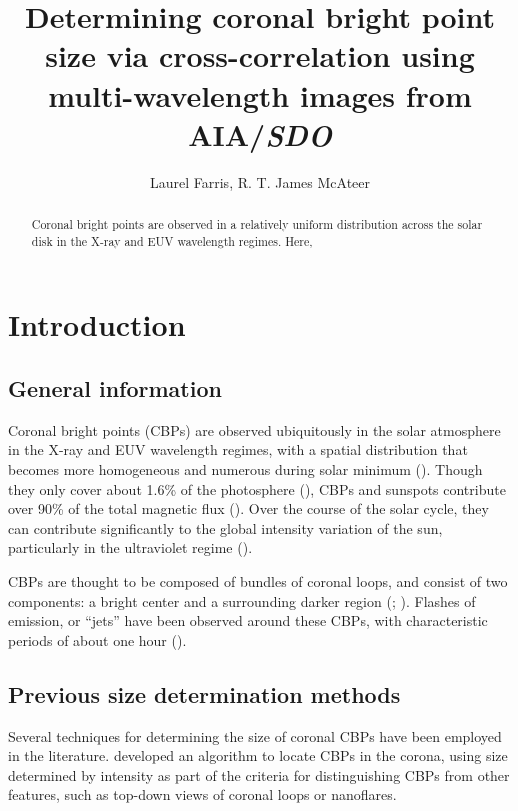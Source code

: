\documentclass[preprint]{aastex}   %
\begin{document}
\title{Determining coronal bright point size via cross-correlation using
multi-wavelength images from AIA/\textit{SDO}}
\author{Laurel Farris, R. T. James McAteer}

\begin{abstract}
Coronal bright points are observed in a relatively uniform distribution across the
solar disk in the X-ray and EUV wavelength regimes.
Here, 
\end{abstract}

\section{Introduction}\label{intro}


\subsection{General information}
Coronal bright points (CBPs)
are observed ubiquitously in the solar atmosphere in the X-ray and EUV
wavelength regimes, with a spatial distribution that becomes more homogeneous
and numerous during solar minimum (\cite{Priest}).
Though they only cover about 1.6\% of the
photosphere (\cite{Srivastava}), CBPs and sunspots
contribute over 90\% of the total magnetic flux (\cite{Howard}).
Over the course of the solar cycle, they can contribute significantly to the
global intensity variation of the sun, particularly in the ultraviolet
regime (\cite{Riethmuller}).

CBPs are thought to be composed of bundles of coronal loops, and
consist of two components: a bright center and a surrounding darker
region (\cite{Zhang}; \cite{Alipour}).
Flashes of emission, or ``jets'' have been observed around these CBPs, with
characteristic periods of about one hour (\cite{Zhang}).

\subsection{Previous size determination methods}
Several techniques for determining the size of coronal CBPs have been employed
in the literature.
\cite{Alipour}
developed an algorithm to locate CBPs in the corona, using size determined
by intensity as part of the criteria for distinguishing CBPs from other features,
such as top-down views of coronal loops or nanoflares.
\end{document}
